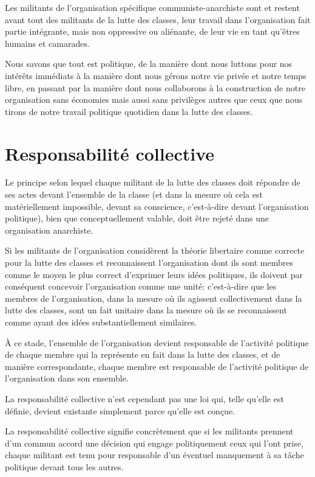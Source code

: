 Les militants de l'organisation spécifique communiste-anarchiste sont et restent avant tout des militants de la lutte des classes, leur travail dans l'organisation fait partie intégrante, mais non oppressive ou aliénante, de leur vie en tant qu'êtres humains et camarades.

Nous savons que tout est politique, de la manière dont nous luttons pour nos intérêts immédiats à la manière dont nous gérons notre vie privée et notre temps libre, en passant par la manière dont nous collaborons à la construction de notre organisation sans économies mais aussi sans privilèges autres que ceux que nous tirons de notre travail politique quotidien dans la lutte des classes.

\section{Responsabilité collective}

Le principe selon lequel chaque militant de la lutte des classes doit répondre de ses actes devant l'ensemble de la classe (et dans la mesure où cela est matériellement impossible, devant sa conscience, c'est-à-dire devant l'organisation politique), bien que conceptuellement valable, doit être rejeté dans une organisation anarchiste.

Si les militants de l'organisation considèrent la théorie libertaire comme correcte pour la lutte des classes et reconnaissent l'organisation dont ils sont membres comme le moyen le plus correct d'exprimer leurs idées politiques, ils doivent par conséquent concevoir l'organisation comme une unité: c'est-à-dire que les membres de l'organisation, dans la mesure où ils agissent collectivement dans la lutte des classes, sont un fait unitaire dans la mesure où ils se reconnaissent comme ayant des idées substantiellement similaires.

À ce stade, l'ensemble de l'organisation devient responsable de l'activité politique de chaque membre qui la représente en fait dans la lutte des classes, et de manière correspondante, chaque membre est responsable de l'activité politique de l'organisation dans son ensemble.

La responsabilité collective n'est cependant pas une loi qui, telle qu'elle est définie, devient existante simplement parce qu'elle est conçue.

La responsabilité collective signifie concrètement que si les militants prennent d'un commun accord une décision qui engage politiquement ceux qui l'ont prise, chaque militant est tenu pour responsable d'un éventuel manquement à sa tâche politique devant tous les autres.

